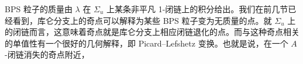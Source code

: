 
BPS 粒子的质量由 $\lambda$ 在 $\Sigma_u$ 上某条非平凡 1-闭链上的积分给出。我们在前几节已经看到，库仑分支上的奇点可以解释为某些 BPS 粒子变为无质量的点。就 $\Sigma_u$ 上的闭链而言，这意味着奇点就是库仑分支上相应闭链退化的点。而与这种奇点相关的单值性有一个很好的几何解释，即 Picard--Lefshetz 变换。也就是说，在一个 $A$-闭链消失的奇点附近，
